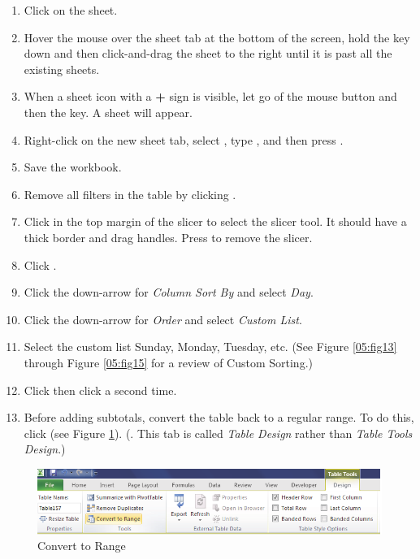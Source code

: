 \begin{enumerate}
	\item Click on the  sheet.
	\item Hover the mouse over the  sheet tab at the bottom of the screen, hold the  key down and then click-and-drag the sheet to the right until it is past all the existing sheets.
	\item When a sheet icon with a \textbf{+} sign is visible, let go of the mouse button and then the  key. A  sheet will appear.
	\item Right-click on the new sheet tab, select , type , and then press .
	\item Save the  workbook.
	\item Remove all filters in the table by clicking .
	\item Click in the top margin of the slicer to select the slicer tool. It should have a thick border and drag handles. Press  to remove the slicer.

	\item Click . 
	\item Click the down-arrow for \textit{Column Sort By} and select \textit{Day}.
	\item Click the down-arrow for \textit{Order} and select \textit{Custom List}.
	\item Select the custom list Sunday, Monday, Tuesday, etc. (See Figure \ref{05:fig13} through Figure \ref{05:fig15} for a review of Custom Sorting.)
	\item Click  then click  a second time.
	\item Before adding subtotals, convert the table back to a regular range. To do this, click  (see Figure \ref{05:fig23}). (. This tab is called \textit{Table Design} rather than \textit{Table Tools Design}.)
\end{enumerate}

\begin{figure}[H]
	\centering
	\includegraphics[width=\maxwidth{.95\linewidth}]{gfx/ch05_fig23}
	\caption{Convert to Range}
	\label{05:fig23}
\end{figure}

